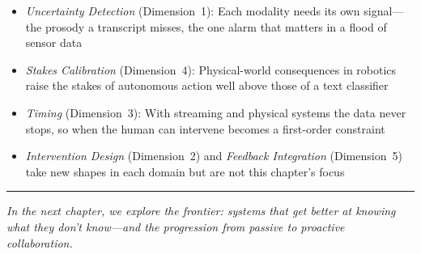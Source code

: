 \begin{itemize}
    \item \textit{Uncertainty Detection} (Dimension~1): Each modality needs its own signal---the prosody a transcript misses, the one alarm that matters in a flood of sensor data
    \item \textit{Stakes Calibration} (Dimension~4): Physical-world consequences in robotics raise the stakes of autonomous action well above those of a text classifier
    \item \textit{Timing} (Dimension~3): With streaming and physical systems the data never stops, so when the human can intervene becomes a first-order constraint
    \item \textit{Intervention Design} (Dimension~2) and \textit{Feedback Integration} (Dimension~5) take new shapes in each domain but are not this chapter's focus
\end{itemize}

\bigskip
\begin{center}
\rule{0.5\textwidth}{0.4pt}
\end{center}
\bigskip

\noindent\textit{In the next chapter, we explore the frontier: systems that get better at knowing what they don't know---and the progression from passive \hitl to proactive \ai collaboration.}
